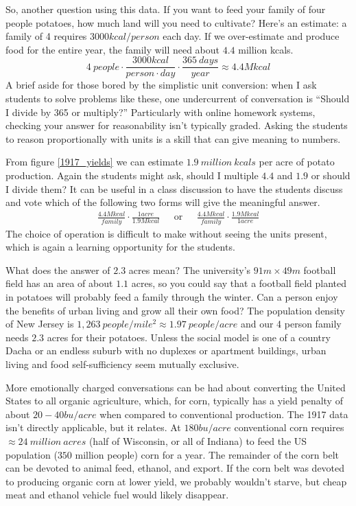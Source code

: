 \documentclass[prb,preprint]{revtex4-2}
\newcommand{\be}{\begin{equation}}
\newcommand{\ee}{\end{equation}}
\newcommand{\bea}{\begin{eqnarray}}
\newcommand{\eea}{\end{eqnarray}}
\begin{document}
So, another question using this data.  If you want to feed your family of four people potatoes, how much land will you need to cultivate?
Here's an estimate: a family of 4 requires $3000kcal/person$ each day.\cite{calorie_age}  If we over-estimate and produce food for the entire year, the family will need about $4.4$ million kcals.
\be
4~people\cdot\frac{3000kcal}{person\cdot day}\cdot\frac{365~days}{year} \approx 4.4 M kcal 
\ee
A brief aside for those bored by the simplistic unit conversion: when I ask students to solve problems like these, one undercurrent of conversation is ``Should I divide by 365 or multiply?''  Particularly with online homework systems, checking your answer for reasonability isn't  typically graded. Asking the students to reason proportionally with units is a skill that can give meaning to numbers. 

From figure \ref{1917_yields} we can estimate $1.9~million~kcals$ per acre of potato production.  Again the students might ask, should I multiple $4.4$ and $1.9$ or should I divide them?  It can be useful in a class discussion to have the students discuss and vote which of the following two forms will give the meaningful answer.
\bea
\frac{4.4 M kcal}{family}\cdot\frac{1 acre}{1.9M kcal}  & \textrm{~~or~~}&
\frac{4.4 M kcal}{family}\cdot\frac{1.9M kcal}{1 acre}
\eea
The choice of operation is difficult to make without seeing the units present, which is again a learning opportunity for the students.

What does the answer of $2.3$ acres mean?  The university's $91m\times49m$ football field has an area of about $1.1$ acres, so you could say that a football field planted in potatoes will probably feed a family through the winter.\cite{Deppe}  Can a person enjoy the benefits of urban living and grow all their own food?  The population density of New Jersey is $1,263~people/mile^2 \approx1.97~people/acre$ and our 4 person family needs $2.3$ acres for their potatoes.  
Unless the social model is one of a country Dacha or an endless suburb with no duplexes or apartment buildings, urban living and food self-sufficiency seem mutually exclusive.


More emotionally charged conversations can be had about converting the United States to all organic agriculture, which, for corn, typically has a yield penalty of about $20-40bu/acre$ when compared to conventional production.  The 1917 data isn't directly applicable, but it relates. At $180bu/acre$ conventional corn requires $\approx 24~million~acres$ (half of Wisconsin, or all of Indiana) to feed the US population ($350$ million people) corn for a year.  The remainder of the corn belt can be devoted to animal feed, ethanol, and export.  If the corn belt was devoted to producing organic corn at lower yield,\cite{organic_corn_yield} we probably wouldn't starve, but cheap meat and ethanol vehicle fuel would likely disappear.   
\end{document}
